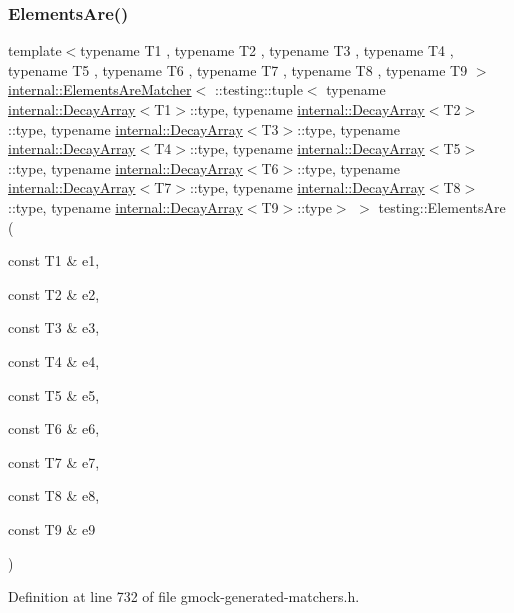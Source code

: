 \subsubsection{\texorpdfstring{Elements\+Are()}{ElementsAre()}\hspace{0.1cm}{\footnotesize\ttfamily [10/11]}}
{\footnotesize\ttfamily template$<$typename T1 , typename T2 , typename T3 , typename T4 , typename T5 , typename T6 , typename T7 , typename T8 , typename T9 $>$ \\
\hyperlink{classtesting_1_1internal_1_1ElementsAreMatcher}{internal\+::\+Elements\+Are\+Matcher}$<$ \+::testing\+::tuple$<$ typename \hyperlink{structtesting_1_1internal_1_1DecayArray}{internal\+::\+Decay\+Array}$<$T1$>$\+::type, typename \hyperlink{structtesting_1_1internal_1_1DecayArray}{internal\+::\+Decay\+Array}$<$T2$>$\+::type, typename \hyperlink{structtesting_1_1internal_1_1DecayArray}{internal\+::\+Decay\+Array}$<$T3$>$\+::type, typename \hyperlink{structtesting_1_1internal_1_1DecayArray}{internal\+::\+Decay\+Array}$<$T4$>$\+::type, typename \hyperlink{structtesting_1_1internal_1_1DecayArray}{internal\+::\+Decay\+Array}$<$T5$>$\+::type, typename \hyperlink{structtesting_1_1internal_1_1DecayArray}{internal\+::\+Decay\+Array}$<$T6$>$\+::type, typename \hyperlink{structtesting_1_1internal_1_1DecayArray}{internal\+::\+Decay\+Array}$<$T7$>$\+::type, typename \hyperlink{structtesting_1_1internal_1_1DecayArray}{internal\+::\+Decay\+Array}$<$T8$>$\+::type, typename \hyperlink{structtesting_1_1internal_1_1DecayArray}{internal\+::\+Decay\+Array}$<$T9$>$\+::type$>$ $>$ testing\+::\+Elements\+Are (\begin{DoxyParamCaption}\item[{const T1 \&}]{e1,  }\item[{const T2 \&}]{e2,  }\item[{const T3 \&}]{e3,  }\item[{const T4 \&}]{e4,  }\item[{const T5 \&}]{e5,  }\item[{const T6 \&}]{e6,  }\item[{const T7 \&}]{e7,  }\item[{const T8 \&}]{e8,  }\item[{const T9 \&}]{e9 }\end{DoxyParamCaption})\hspace{0.3cm}{\ttfamily [inline]}}



Definition at line 732 of file gmock-\/generated-\/matchers.\+h.



